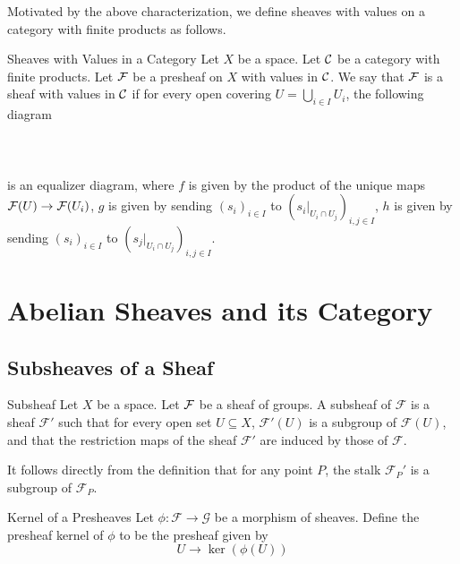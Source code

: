 \documentclass[a4paper]{article}
\begin{document}
Motivated by the above characterization, we define sheaves with values on a category with finite products as follows. 

\begin{defn}{Sheaves with Values in a Category}{} Let $X$ be a space. Let $\mathcal{C}$ be a category with finite products. Let $\mathcal{F}$ be a presheaf on $X$ with values in $\mathcal{C}$. We say that $\mathcal{F}$ is a sheaf with values in $\mathcal{C}$ if for every open covering $U=\bigcup_{i\in I}U_i$, the following diagram \\~\\
\\~\\
is an equalizer diagram, where $f$ is given by the product of the unique maps $\mathcal{F}(U)\to\mathcal{F}(U_i)$, $g$ is given by sending $(s_i)_{i\in I}$ to $(s_i|_{U_i\cap U_j})_{i,j\in I}$, $h$ is given by sending $(s_i)_{i\in I}$ to $(s_j|_{U_i\cap U_j})_{i,j\in I}$. 
\end{defn}

\pagebreak
\section{Abelian Sheaves and its Category}
\subsection{Subsheaves of a Sheaf}
\begin{defn}{Subsheaf}{} Let $X$ be a space. Let $\mathcal{F}$ be a sheaf of groups. A subsheaf of $\mathcal{F}$ is a sheaf $\mathcal{F}'$ such that for every open set $U\subseteq X$, $\mathcal{F}'(U)$ is a subgroup of $\mathcal{F}(U)$, and that the restriction maps of the sheaf $\mathcal{F}'$ are induced by those of $\mathcal{F}$. 
\end{defn}

It follows directly from the definition that for any point $P$, the stalk $\mathcal{F}_P'$ is a subgroup of $\mathcal{F}_P$. 

\begin{defn}{Kernel of a Presheaves}{} Let $\phi:\mathcal{F}\to\mathcal{G}$ be a morphism of sheaves. Define the presheaf kernel of $\phi$ to be the presheaf given by $$U\to\ker(\phi(U))$$ 
\end{defn}
\end{document}
